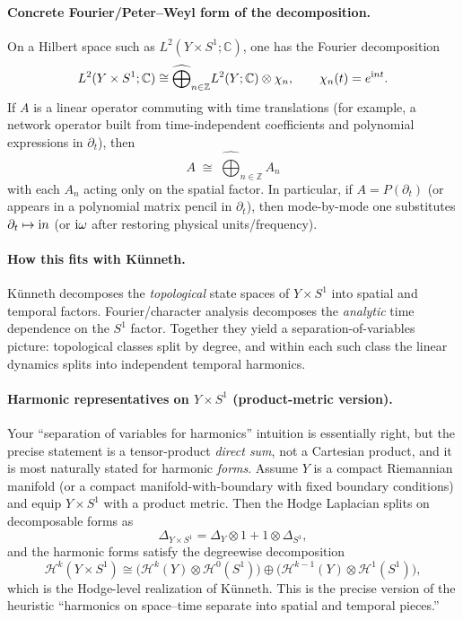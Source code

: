 \documentclass[11pt]{article}
\begin{document}
\paragraph{Concrete Fourier/Peter--Weyl form of the decomposition.}
On a Hilbert space such as $L^2(Y\times S^1;\mathbb{C})$, one has the Fourier decomposition
\[
L^2(Y\times S^1;\mathbb{C})
\cong
\widehat{\bigoplus}_{n\in\mathbb{Z}}
L^2(Y;\mathbb{C})\otimes \chi_n,
\qquad
\chi_n(t)=e^{\mathrm{i} n t}.
\]
If $A$ is a linear operator commuting with time translations (for example, a network operator built from time-independent coefficients and polynomial expressions in $\partial_t$), then
\[
A \;\cong\; \widehat{\bigoplus}_{n\in\mathbb{Z}} A_n
\]
with each $A_n$ acting only on the spatial factor.
In particular, if $A=P(\partial_t)$ (or appears in a polynomial matrix pencil in $\partial_t$), then mode-by-mode one substitutes $\partial_t\mapsto \mathrm{i} n$ (or $\mathrm{i}\omega$ after restoring physical units/frequency).

\paragraph{How this fits with K\"unneth.}
K\"unneth decomposes the \emph{topological} state spaces of $Y\times S^1$ into spatial and temporal factors.
Fourier/character analysis decomposes the \emph{analytic} time dependence on the $S^1$ factor.
Together they yield a separation-of-variables picture: topological classes split by degree, and within each such class the linear dynamics splits into independent temporal harmonics.

\paragraph{Harmonic representatives on \texorpdfstring{$Y\times S^1$}{YxS1} (product-metric version).}
Your ``separation of variables for harmonics'' intuition is essentially right, but the precise statement is a tensor-product \emph{direct sum}, not a Cartesian product, and it is most naturally stated for harmonic \emph{forms}.
Assume $Y$ is a compact Riemannian manifold (or a compact manifold-with-boundary with fixed boundary conditions) and equip $Y\times S^1$ with a product metric.
Then the Hodge Laplacian splits on decomposable forms as
\[
\Delta_{Y\times S^1}=\Delta_Y\otimes 1 + 1\otimes \Delta_{S^1},
\]
and the harmonic forms satisfy the degreewise decomposition
\[
\mathcal{H}^k(Y\times S^1)
\cong
\big(\mathcal{H}^k(Y)\otimes \mathcal{H}^0(S^1)\big)
\oplus
\big(\mathcal{H}^{k-1}(Y)\otimes \mathcal{H}^1(S^1)\big),
\]
which is the Hodge-level realization of K\"unneth.
This is the precise version of the heuristic ``harmonics on space--time separate into spatial and temporal pieces.''
\end{document}
